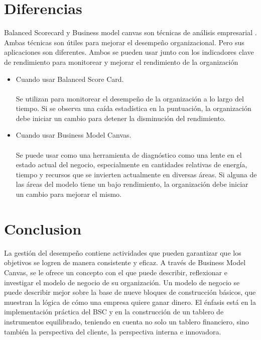 \documentclass[preprint,12pt]{elsarticle}
\begin{document}

\section{Diferencias}
Balanced Scorecard y Business model canvas son t\'ecnicas de análisis empresarial . Ambas t\'ecnicas son \'utiles para mejorar el desempeño organizacional. Pero sus aplicaciones son diferentes. Ambos se pueden usar junto con los indicadores clave de rendimiento para monitorear y mejorar el rendimiento de la organización
\begin{itemize}
\item Cuando usar Balanced Score Card.
   \\
    \\Se utilizan para monitorear el desempeño de la organización a lo largo del tiempo. Si se observa una caída estadística en la puntuación, la organización debe iniciar un cambio para detener la disminución del rendimiento. 
\item Cuando usar Business Model Canvas.
\\
      \\ Se puede usar como una herramienta de diagnóstico como una lente en el estado actual del negocio, especialmente en cantidades relativas de energía, tiempo y recursos que se invierten actualmente en diversas áreas. Si alguna de las áreas del modelo tiene un bajo rendimiento, la organización debe iniciar un cambio para mejorar el mismo.

\end{itemize}
	
	
\section{Conclusion}
   La gestión del desempeño contiene actividades que pueden garantizar que los objetivos se logren de manera consistente y eficaz. A través de Business Model Canvas, se le ofrece un concepto con el que puede describir, reflexionar e investigar el modelo de negocio de su organización. Un modelo de negocio se puede describir mejor sobre la base de nueve bloques de construcción básicos, que muestran la lógica de cómo una empresa quiere ganar dinero.
 El énfasis está en la implementación práctica del BSC y en la construcción de un tablero de instrumentos equilibrado, teniendo en cuenta no solo un tablero financiero, sino también la perspectiva del cliente, la perspectiva interna e innovadora. 
          
\end{document}

